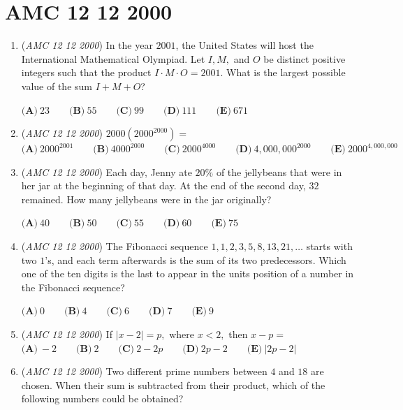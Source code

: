 \section{AMC 12 12 2000}
        \begin{enumerate}
        	\item (\textit{AMC 12 12 2000}) In the year $2001$, the United States will host the International Mathematical Olympiad. Let $I,M,$ and $O$ be distinct positive integers such that the product $I \cdot M \cdot O = 2001$. What is the largest possible value of the sum $I + M + O$?


 $\textbf{(A)}\ 23 \qquad \textbf{(B)}\ 55 \qquad \textbf{(C)}\ 99 \qquad \textbf{(D)}\ 111 \qquad \textbf{(E)}\ 671$


	\item (\textit{AMC 12 12 2000}) $2000(2000^{2000}) =$
$\textbf{(A)}\ 2000^{2001} \qquad \textbf{(B)}\ 4000^{2000} \qquad \textbf{(C)}\ 2000^{4000} \qquad \textbf{(D)}\ 4,000,000^{2000} \qquad \textbf{(E)}\ 2000^{4,000,000}$


	\item (\textit{AMC 12 12 2000}) Each day, Jenny ate $20\%$ of the jellybeans that were in her jar at the beginning of that day. At the end of the second day, $32$ remained. How many jellybeans were in the jar originally?


 $\textbf{(A)}\ 40 \qquad \textbf{(B)}\ 50 \qquad \textbf{(C)}\ 55 \qquad \textbf{(D)}\ 60 \qquad \textbf{(E)}\ 75$


	\item (\textit{AMC 12 12 2000}) The Fibonacci sequence $1,1,2,3,5,8,13,21,\ldots$ starts with two $1$'s, and each term afterwards is the sum of its two predecessors. Which one of the ten digits is the last to appear in the units position of a number in the Fibonacci sequence?


 $\textbf{(A)}\ 0 \qquad \textbf{(B)}\ 4 \qquad \textbf{(C)}\ 6 \qquad \textbf{(D)}\ 7 \qquad \textbf{(E)}\ 9$


	\item (\textit{AMC 12 12 2000}) If $|x - 2| = p,$ where $x < 2,$ then $x - p =$
$\textbf{(A)}\ -2 \qquad \textbf{(B)}\ 2 \qquad \textbf{(C)}\ 2-2p \qquad \textbf{(D)}\ 2p-2 \qquad \textbf{(E)}\ |2p-2|$


	\item (\textit{AMC 12 12 2000}) Two different prime numbers between $4$ and $18$ are chosen. When their sum is subtracted from their product, which of the following numbers could be obtained?



\end{enumerate}
